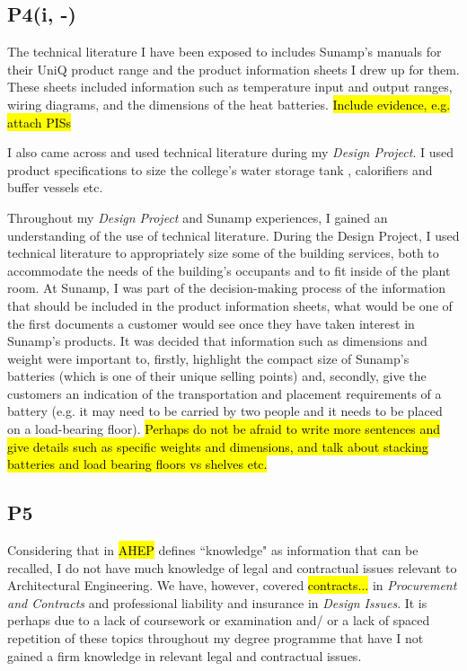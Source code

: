 \subsection*{P4(i, -)}

The technical literature I have been exposed to includes Sunamp's manuals for their UniQ product range and the product information sheets I drew up for them.
These sheets included information such as temperature input and output ranges, wiring diagrams, and the dimensions of the heat batteries.
\hl{Include evidence, e.g. attach PISs}

I also came across and used technical literature during my \textit{Design Project}.
I used product specifications to size the college's water storage tank \citep{Decca}, calorifiers and buffer vessels \citep{RycroftLtd} etc.

Throughout my \textit{Design Project} and Sunamp experiences, I gained an understanding of the use of technical literature.
During the Design Project, I used technical literature to appropriately size some of the building services, both to accommodate the needs of the building's occupants and to fit inside of the plant room.
At Sunamp, I was part of the decision-making process of the information that should be included in the product information sheets, what would be one of the first documents a customer would see once they have taken interest in Sunamp's products.
It was decided that information such as dimensions and weight were important to, firstly, highlight the compact size of Sunamp's batteries (which is one of their unique selling points) and, secondly, give the customers an indication of the transportation and placement requirements of a battery (e.g. it may need to be carried by two people and it needs to be placed on a load-bearing floor).
\hl{Perhaps do not be afraid to write more sentences and give details such as specific weights and dimensions, and talk about stacking batteries and load bearing floors vs shelves etc.}


\subsection*{P5}

Considering that in \hl{AHEP} defines ``knowledge" as information that can be recalled, I do not have much knowledge of legal and contractual issues relevant to Architectural Engineering.
We have, however, covered \hl{contracts...} in \textit{Procurement and Contracts} and professional liability and insurance in \textit{Design Issues}.
It is perhaps due to a lack of coursework or examination and/ or a lack of spaced repetition of these topics throughout my degree programme that have I not gained a firm knowledge in relevant legal and contractual issues.


